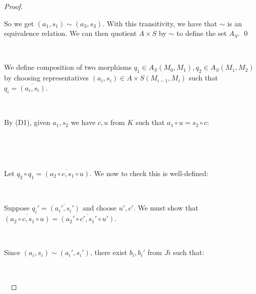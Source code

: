 \documentclass[12pt]{amsart}    %
\theoremstyle{definition}
\begin{document}
\begin{proof}
\

So we get $(a_1, s_1) \sim (a_3,s_3)$.  With this transitivity, we have that $\sim$ is an equivalence relation.  We can then quotient $A\times S$ by $\sim$ to define the set $A_S$. \qed

\

We define composition of two morphisms $q_1 \in A_S(M_0,M_1), q_2 \in A_S(M_1,M_2)$ by choosing representatives $(a_i,s_i)\in A\times S(M_{i-1},M_i)$ such that $q_i = \overline{(a_i,s_i)}$.

\


By (D1), given $a_1, s_2$ we have $c,u$ from $K$ such that $a_1 \circ u = s_2 \circ c$:

\


\begin{center}
   \end{center}

\


Let $q_2 \circ q_1 = \overline{(a_2 \circ c, s_1 \circ u)}$.  We now to check this is well-defined:

\

Suppose $q_i' = \overline{(a_i',s_i')}$ and choose $u', c'$.  We must show that $\overline{(a_2 \circ c, s_1 \circ u)} = \overline{(a_2' \circ c', s_1' \circ u')}$.  

\

Since $(a_i,s_i) \sim (a_i', s_i')$, there exist $b_i, b_i'$ from $Ji$ such that:

\


\


\end{proof}
\end{document}
